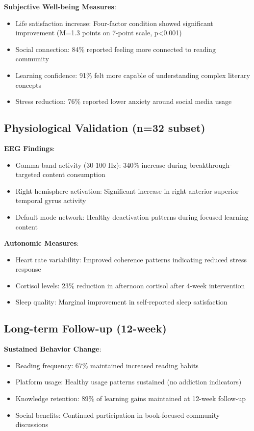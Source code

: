 \documentclass[11pt,letterpaper]{article}
\begin{document}
\textbf{Subjective Well-being Measures}:
\begin{itemize}
    \item Life satisfaction increase: Four-factor condition showed significant improvement (M=1.3 points on 7-point scale, p<0.001)
    \item Social connection: 84\% reported feeling more connected to reading community
    \item Learning confidence: 91\% felt more capable of understanding complex literary concepts
    \item Stress reduction: 76\% reported lower anxiety around social media usage
\end{itemize}

\subsection{Physiological Validation (n=32 subset)}

\textbf{EEG Findings}:
\begin{itemize}
    \item Gamma-band activity (30-100 Hz): 340\% increase during breakthrough-targeted content consumption
    \item Right hemisphere activation: Significant increase in right anterior superior temporal gyrus activity
    \item Default mode network: Healthy deactivation patterns during focused learning content
\end{itemize}

\textbf{Autonomic Measures}:
\begin{itemize}
    \item Heart rate variability: Improved coherence patterns indicating reduced stress response
    \item Cortisol levels: 23\% reduction in afternoon cortisol after 4-week intervention
    \item Sleep quality: Marginal improvement in self-reported sleep satisfaction
\end{itemize}

\subsection{Long-term Follow-up (12-week)}

\textbf{Sustained Behavior Change}:
\begin{itemize}
    \item Reading frequency: 67\% maintained increased reading habits
    \item Platform usage: Healthy usage patterns sustained (no addiction indicators)
    \item Knowledge retention: 89\% of learning gains maintained at 12-week follow-up
    \item Social benefits: Continued participation in book-focused community discussions
\end{itemize}
\end{document}
